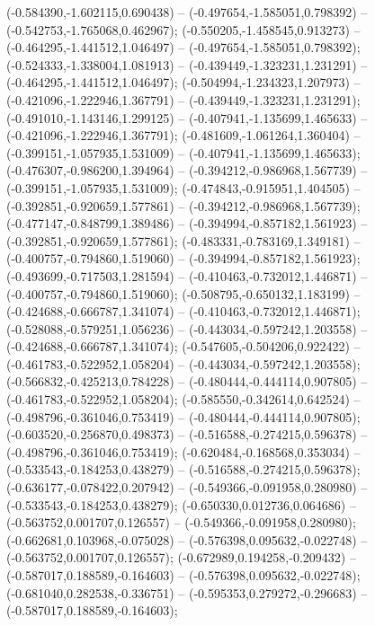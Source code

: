  (-0.584390,-1.602115,0.690438) -- (-0.497654,-1.585051,0.798392) -- (-0.542753,-1.765068,0.462967);
 (-0.550205,-1.458545,0.913273) -- (-0.464295,-1.441512,1.046497) -- (-0.497654,-1.585051,0.798392);
 (-0.524333,-1.338004,1.081913) -- (-0.439449,-1.323231,1.231291) -- (-0.464295,-1.441512,1.046497);
 (-0.504994,-1.234323,1.207973) -- (-0.421096,-1.222946,1.367791) -- (-0.439449,-1.323231,1.231291);
 (-0.491010,-1.143146,1.299125) -- (-0.407941,-1.135699,1.465633) -- (-0.421096,-1.222946,1.367791);
 (-0.481609,-1.061264,1.360404) -- (-0.399151,-1.057935,1.531009) -- (-0.407941,-1.135699,1.465633);
 (-0.476307,-0.986200,1.394964) -- (-0.394212,-0.986968,1.567739) -- (-0.399151,-1.057935,1.531009);
 (-0.474843,-0.915951,1.404505) -- (-0.392851,-0.920659,1.577861) -- (-0.394212,-0.986968,1.567739);
 (-0.477147,-0.848799,1.389486) -- (-0.394994,-0.857182,1.561923) -- (-0.392851,-0.920659,1.577861);
 (-0.483331,-0.783169,1.349181) -- (-0.400757,-0.794860,1.519060) -- (-0.394994,-0.857182,1.561923);
 (-0.493699,-0.717503,1.281594) -- (-0.410463,-0.732012,1.446871) -- (-0.400757,-0.794860,1.519060);
 (-0.508795,-0.650132,1.183199) -- (-0.424688,-0.666787,1.341074) -- (-0.410463,-0.732012,1.446871);
 (-0.528088,-0.579251,1.056236) -- (-0.443034,-0.597242,1.203558) -- (-0.424688,-0.666787,1.341074);
 (-0.547605,-0.504206,0.922422) -- (-0.461783,-0.522952,1.058204) -- (-0.443034,-0.597242,1.203558);
 (-0.566832,-0.425213,0.784228) -- (-0.480444,-0.444114,0.907805) -- (-0.461783,-0.522952,1.058204);
 (-0.585550,-0.342614,0.642524) -- (-0.498796,-0.361046,0.753419) -- (-0.480444,-0.444114,0.907805);
 (-0.603520,-0.256870,0.498373) -- (-0.516588,-0.274215,0.596378) -- (-0.498796,-0.361046,0.753419);
 (-0.620484,-0.168568,0.353034) -- (-0.533543,-0.184253,0.438279) -- (-0.516588,-0.274215,0.596378);
 (-0.636177,-0.078422,0.207942) -- (-0.549366,-0.091958,0.280980) -- (-0.533543,-0.184253,0.438279);
 (-0.650330,0.012736,0.064686) -- (-0.563752,0.001707,0.126557) -- (-0.549366,-0.091958,0.280980);
 (-0.662681,0.103968,-0.075028) -- (-0.576398,0.095632,-0.022748) -- (-0.563752,0.001707,0.126557);
 (-0.672989,0.194258,-0.209432) -- (-0.587017,0.188589,-0.164603) -- (-0.576398,0.095632,-0.022748);
 (-0.681040,0.282538,-0.336751) -- (-0.595353,0.279272,-0.296683) -- (-0.587017,0.188589,-0.164603);
